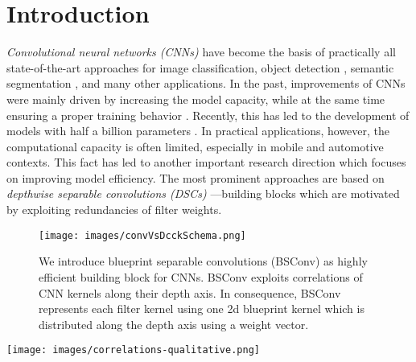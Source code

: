 \documentclass[10pt,twocolumn,letterpaper]{article}
\newcommand{\DCCK}{BSConv\xspace}
\newcommand{\spatialK}{K}
\newcommand{\channelInCount}{M}
\begin{document}
\section{Introduction}
\textit{Convolutional neural networks (CNNs)} \cite{lecun1989backpropagation,krizhevsky2012imagenet} have become the basis of practically all state-of-the-art approaches for image classification, object detection \cite{girshick2014rich}, semantic segmentation \cite{long2015fully}, and many other applications.
In the past, improvements of CNNs were mainly driven by increasing the model capacity, while at the same time ensuring a proper training behavior \cite{ioffe2015batch,he2016deep,he2016identity}.
Recently, this has led to the development of models with half a billion parameters \cite{huang2018gpipe}.
In practical applications, however, the computational capacity is often limited, especially in mobile and automotive contexts.
This fact has led to another important research direction which focuses on improving model efficiency.
The most prominent approaches are based on \textit{depthwise separable convolutions (DSCs)} \cite{sifre2014rigid,howard2017mobilenets}---building blocks which are motivated by exploiting redundancies of filter weights.

\begin{figure}
	\center
	\texttt{[image: images/convVsDcckSchema.png]}
	\caption{We introduce blueprint separable convolutions (\DCCK) as highly efficient building block for CNNs.
		\DCCK exploits correlations of CNN kernels along their depth axis.
		In consequence, \DCCK represents each filter kernel using one 2d blueprint kernel which is distributed along the depth axis using a weight vector.\vspace{-0.2em}
	}
	\label{fig:convVsDcckSchema}
\end{figure}
\begin{figure*}
	\center
	\texttt{[image: images/correlations-qualitative.png]}
	\caption{Exemplary filter weights of a vanilla VGG-19, Inception v2, and ResNet-50 CNN trained on ImageNet.
		For each of the three CNN architectures, \textit{one} filter kernel of size $\channelInCount \times \spatialK \times \spatialK = 128 \times 3 \times 3$ is visualized, split into 128 images.
		The weights of each filter kernel are highly correlated along the depth axis.
		Concretely, most slices show the same filter-specific $3 \times 3$ `blueprint', only scaled by different factors (including negative factors which cause `inverted' versions of the blueprint).
		While only three slices are highlighted for each kernel, the correlation is visible for far more slices (52/128 for the ResNet-50 example).
		This observation is the motivation for our proposal of \textit{blueprint separable convolutions (\DCCK)}, which inherently represent a filter kernel of size $\channelInCount \times \spatialK \times \spatialK$ using one blueprint kernel of size $\spatialK \times \spatialK$ and a set of $\channelInCount$ multiplicative factors used to distribute the blueprint across the depth axis.
	}
     \label{fig:W_a}
\end{figure*}
\end{document}
